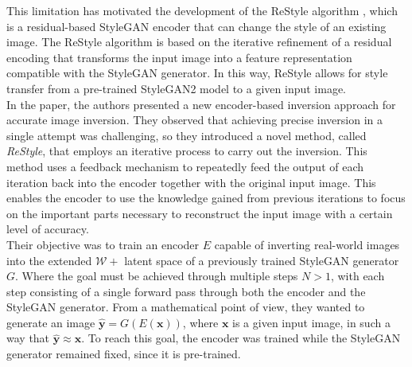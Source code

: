 \noindent This limitation has motivated the development of the ReStyle algorithm \cite{alaluf2021restyle}, which is a residual-based StyleGAN encoder that can change the style of an existing image. The ReStyle algorithm is based on the iterative refinement of a residual encoding that transforms the input image into a feature representation compatible with the StyleGAN generator. In this way, ReStyle allows for style transfer from a pre-trained StyleGAN2 model to a given input image.\\
In the paper, the authors presented a new encoder-based inversion approach for accurate image inversion. They observed that achieving precise inversion in a single attempt was challenging, so they introduced a novel method, called \textit{ReStyle}, that employs an iterative process to carry out the inversion. This method uses a feedback mechanism to repeatedly feed the output of each iteration back into the encoder together with the original input image. This enables the encoder to use the knowledge gained from previous iterations to focus on the important parts necessary to reconstruct the input image with a certain level of accuracy.\\
Their objective was to train an encoder $E$ capable of inverting real-world images into the extended $\mathcal{W}+$ latent space of a previously trained StyleGAN generator $G$. Where the goal must be achieved through multiple steps $N>1$, with each step consisting of a single forward pass through both the encoder and the StyleGAN generator. From a mathematical point of view, they wanted to generate an image $\hat{\textbf{y}} = G(E(\textbf{x}))$, where $\textbf{x}$ is a given input image, in such a way that $\hat{\textbf{y}} \approx \textbf{x}$. To reach this goal, the encoder was trained while the StyleGAN generator remained fixed, since it is pre-trained.
%
